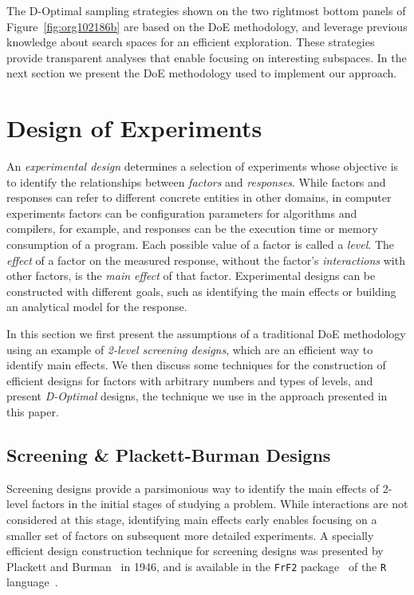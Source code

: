 \documentclass[conference]{IEEEtran}
\begin{document}
The D-Optimal sampling strategies shown on the two rightmost bottom panels of
Figure~\ref{fig:org102186b} are based on the DoE
methodology, and leverage previous knowledge about search spaces for an
efficient exploration. These strategies provide transparent analyses that
enable focusing on interesting subspaces. In the next
section we present the DoE methodology used to implement our
approach.
\section{Design of Experiments}
\label{sec:org5707f48}
An \emph{experimental design} determines a selection of experiments whose objective
is to identify the relationships between \emph{factors} and \emph{responses}. While
factors and responses can refer to different concrete entities in other domains,
in computer experiments factors can be configuration parameters for algorithms
and compilers, for example, and responses can be the execution time or memory
consumption of a program. Each possible value of a factor is called a \emph{level}.
The \emph{effect} of a factor on the measured response, without the factor's
\emph{interactions} with other factors, is the \emph{main effect} of that factor.
Experimental designs can be constructed with different goals, such as
identifying the main effects or building an analytical model for the response.

In this section we first present the assumptions of a traditional DoE
methodology using an example of \emph{2-level screening designs}, which
are an efficient way to identify main effects. We then discuss some techniques
for the construction of efficient designs for factors with arbitrary numbers and
types of levels, and present \emph{D-Optimal} designs, the technique we use in the
approach presented in this paper.
\subsection{Screening \& Plackett-Burman Designs}
\label{sec:org9e7a41f}
Screening designs provide a parsimonious way to identify the main
effects of 2-level factors in the initial stages of studying a problem. While
interactions are not considered at this stage, identifying main effects early
enables focusing on a smaller set of factors on subsequent more detailed
experiments. A specially efficient design construction technique for screening
designs was presented by Plackett and Burman~\cite{plackett1946design} in
1946, and is available in the \texttt{FrF2}
package~\cite{gromping2014frf2} of the \texttt{R}
language~\cite{team2018rlanguage}.
\end{document}
